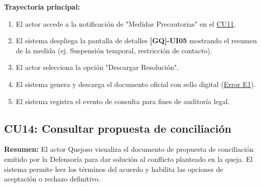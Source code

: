 \begin{appendices}
\textbf{Trayectoria principal:}
\begin{enumerate}[nosep]
    \item El actor accede a la notificación de "Medidas Precautorias" en el \hyperlink{anexo:casos_uso}{CU11}.
    \item El sistema despliega la pantalla de detalles \textbf{[GQ]-UI05} mostrando el resumen de la medida (ej. Suspensión temporal, restricción de contacto).
    \item El actor selecciona la opción "Descargar Resolución".
    \item El sistema genera y descarga el documento oficial con sello digital (\hyperlink{err:E18}{Error E1}).
    \item El sistema registra el evento de consulta para fines de auditoría legal.
\end{enumerate}

\subsection{CU14: Consultar propuesta de conciliación}

\textbf{Resumen:} 
El actor Quejoso visualiza el documento de propuesta de conciliación emitido por la Defensoría para dar solución al conflicto planteado en la queja. El sistema permite leer los términos del acuerdo y habilita las opciones de aceptación o rechazo definitivo.


\end{appendices}
